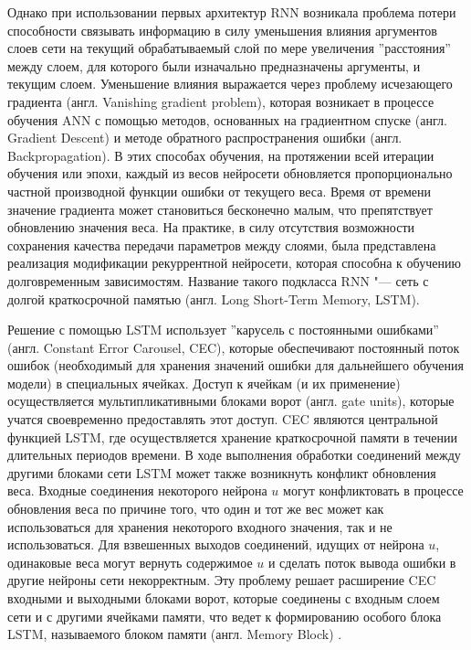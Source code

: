 \documentclass[bachelor, och, coursework]{SCWorks}
\begin{document}
        Однако при использовании первых архитектур RNN возникала проблема потери
        способности связывать информацию в силу уменьшения влияния аргументов
        слоев сети на текущий обрабатываемый слой по мере увеличения
        ''расстояния'' между слоем, для которого были изначально предназначены
        аргументы, и текущим слоем. Уменьшение влияния выражается через проблему
        исчезающего градиента (англ. Vanishing gradient problem), которая
        возникает в процессе обучения ANN с помощью методов, основанных на
        градиентном спуске (англ. Gradient Descent) и методе обратного
        распространения ошибки (англ. Backpropagation). В этих способах
        обучения, на протяжении всей итерации обучения или эпохи, каждый из
        весов нейросети обновляется пропорционально частной производной функции
        ошибки от текущего веса. Время от времени значение градиента может
        становиться бесконечно малым, что препятствует обновлению значения веса.
        На практике, в силу отсутствия возможности сохранения качества передачи
        параметров между слоями, была представлена реализация модификации
        рекуррентной нейросети, которая способна к обучению долговременным
        зависимостям. Название такого подкласса RNN "--- сеть с долгой
        краткосрочной памятью (англ. Long Short-Term Memory, LSTM).

        Решение с помощью LSTM использует ''карусель с постоянными ошибками''
        (англ. Constant Error Carousel, CEC), которые обеспечивают постоянный
        поток ошибок (необходимый для хранения значений ошибки для дальнейшего
        обучения модели) в специальных ячейках. Доступ к ячейкам (и их
        применение) осуществляется мультипликативными блоками ворот (англ. gate
        units), которые учатся своевременно предоставлять этот доступ. CEC
        являются центральной функцией LSTM, где осуществляется хранение
        краткосрочной памяти в течении длительных периодов времени. В ходе
        выполнения обработки соединений между другими блоками сети LSTM может
        также возникнуть конфликт обновления веса. Входные соединения некоторого
        нейрона $u$ могут конфликтовать в процессе обновления веса по причине
        того, что один и тот же вес может как использоваться для хранения
        некоторого входного значения, так и не использоваться. Для взвешенных
        выходов соединений, идущих от нейрона $u$, одинаковые веса могут вернуть
        содержимое $u$ и сделать поток вывода ошибки в другие нейроны сети
        некорректным. Эту проблему решает расширение CEC входными и выходными
        блоками ворот, которые соединены с входным слоем сети и с другими
        ячейками памяти, что ведет к формированию особого блока LSTM,
        называемого блоком памяти (англ. Memory Block) \cite{lstm1}.
\end{document}
